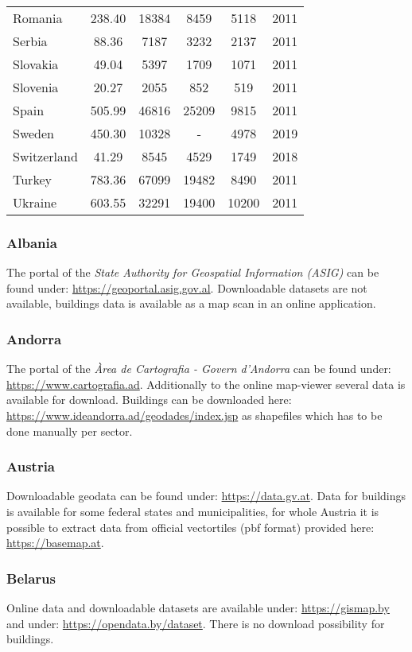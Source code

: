 \documentclass[final, 3p, times, 12pt]{elsarticle} %
\begin{document}
\begin{table}
\begin{minipage}{\textwidth}
\begin{center}
\begin{tabular}{ |l|S[table-format=4.2]|S[table-format=5.0]|S[table-format=5.0]|S[table-format=5.0]|c|}
 Romania & 238.40 & 18384 & 8459 & 5118 & 2011\\
 Serbia & 88.36 & 7187 & 3232 & 2137 & 2011\\
 Slovakia & 49.04 & 5397 & 1709 & 1071 & 2011\\
 Slovenia & 20.27 & 2055 & 852 & 519 & 2011\\
 Spain & 505.99 & 46816 & 25209 & 9815 & 2011\\
 Sweden & 450.30 & 10328 & {-} & 4978 & 2019\\
 Switzerland & 41.29 & 8545 & 4529 & 1749 & 2018\\
 Turkey & 783.36 & 67099 & 19482 & 8490 & 2011\\
 Ukraine & 603.55 & 32291 & 19400 & 10200 & 2011\\
 \hline
\end{tabular}
\end{center}
\end{minipage}
\end{table}

\subsubsection{Albania}
The portal of the \emph{State Authority for Geospatial Information (ASIG)} can be found under: \url{https://geoportal.asig.gov.al}. Downloadable datasets are not available, buildings data is available as a map scan in an online application.
\subsubsection{Andorra}
The portal of the \emph{Àrea de Cartografia - Govern d'Andorra} can be found under: \url{https://www.cartografia.ad}. Additionally to the online map-viewer several data is available for download. Buildings can be downloaded here: \url{https://www.ideandorra.ad/geodades/index.jsp} as shapefiles which has to be done manually per sector.
\subsubsection{Austria}
Downloadable geodata can be found under: \url{https://data.gv.at}. Data for buildings is available for some federal states and municipalities, for whole Austria it is possible to extract data from official vectortiles (pbf format) provided here: \url{https://basemap.at}.
\subsubsection{Belarus}
Online data and downloadable datasets are available under: \url{https://gismap.by} and under: \url{https://opendata.by/dataset}. There is no download possibility for buildings.
\end{document}
